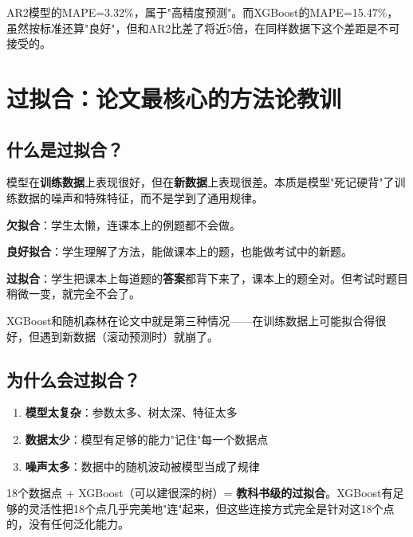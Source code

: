 \documentclass[12pt, a4paper]{article}
\begin{document}
\begin{examplebox}[论文中MAPE=3.32\%意味着什么？]
AR2模型的MAPE=3.32\%，属于"高精度预测"。而XGBoost的MAPE=15.47\%，虽然按标准还算"良好"，但和AR2比差了将近5倍，在同样数据下这个差距是不可接受的。
\end{examplebox}

\section{过拟合：论文最核心的方法论教训}

\subsection{什么是过拟合？}

\begin{conceptbox}[过拟合]
模型在\textbf{训练数据}上表现很好，但在\textbf{新数据}上表现很差。本质是模型"死记硬背"了训练数据的噪声和特殊特征，而不是学到了通用规律。
\end{conceptbox}

\begin{examplebox}[一个通俗的类比]
\textbf{欠拟合}：学生太懒，连课本上的例题都不会做。

\textbf{良好拟合}：学生理解了方法，能做课本上的题，也能做考试中的新题。

\textbf{过拟合}：学生把课本上每道题的\textbf{答案}都背下来了，课本上的题全对。但考试时题目稍微一变，就完全不会了。

XGBoost和随机森林在论文中就是第三种情况——在训练数据上可能拟合得很好，但遇到新数据（滚动预测时）就崩了。
\end{examplebox}

\subsection{为什么会过拟合？}

\begin{enumerate}[leftmargin=2em]
\item \textbf{模型太复杂}：参数太多、树太深、特征太多
\item \textbf{数据太少}：模型有足够的能力"记住"每一个数据点
\item \textbf{噪声太多}：数据中的随机波动被模型当成了规律
\end{enumerate}

\begin{warningbox}[论文的极端案例]
18个数据点 + XGBoost（可以建很深的树）= \textbf{教科书级的过拟合}。XGBoost有足够的灵活性把18个点几乎完美地"连"起来，但这些连接方式完全是针对这18个点的，没有任何泛化能力。
\end{warningbox}
\end{document}
